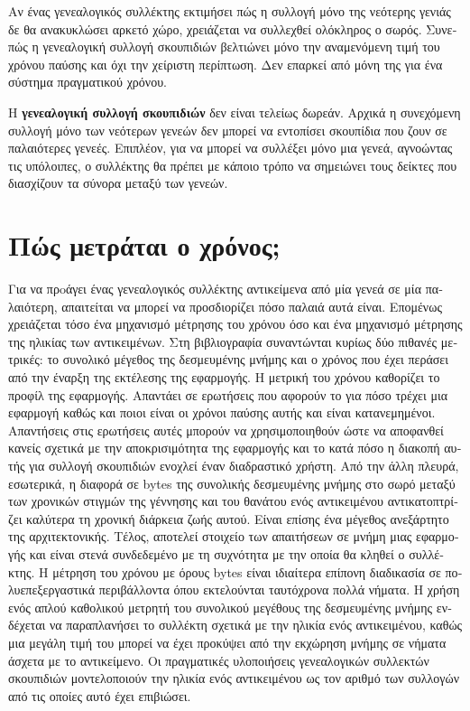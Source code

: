 \begin{greek}
Αν ένας γενεαλογικός συλλέκτης εκτιμήσει πώς η συλλογή μόνο
της νεότερης γενιάς δε θα ανακυκλώσει αρκετό χώρο, χρειάζεται
να συλλεχθεί ολόκληρος ο σωρός. Συνεπώς η γενεαλογική συλλογή
σκουπιδιών βελτιώνει μόνο την αναμενόμενη τιμή του χρόνου παύσης
και όχι την χείριστη περίπτωση. Δεν επαρκεί από μόνη της για ένα
σύστημα πραγματικού χρόνου.

Η \textbf{γενεαλογική συλλογή σκουπιδιών} δεν είναι τελείως
δωρεάν. Αρχικά η συνεχόμενη συλλογή μόνο των νεότερων γενεών
δεν μπορεί να εντοπίσει σκουπίδια που ζουν σε παλαιότερες γενεές.
Επιπλέον, για να μπορεί να συλλέξει μόνο μια γενεά, αγνοώντας
τις υπόλοιπες, ο συλλέκτης θα πρέπει με κάποιο τρόπο να σημειώνει
τους δείκτες που διασχίζουν τα σύνορα μεταξύ των γενεών.

\section{Πώς μετράται ο χρόνος;}
Για να πρoάγει ένας γενεαλογικός συλλέκτης αντικείμενα από μία γενεά σε μία 
παλαιότερη, απαιτείται να μπορεί να προσδιορίζει πόσο παλαιά αυτά είναι. 
Επομένως χρειάζεται τόσο ένα μηχανισμό μέτρησης του χρόνου όσο και ένα μηχανισμό 
μέτρησης της ηλικίας των αντικειμένων. Στη βιβλιογραφία συναντώνται κυρίως δύο 
πιθανές μετρικές: το συνολικό μέγεθος της δεσμευμένης μνήμης και ο χρόνος που 
έχει περάσει από την έναρξη της εκτέλεσης της εφαρμογής. Η μετρική του χρόνου 
καθορίζει το προφίλ της εφαρμογής. Απαντάει σε ερωτήσεις που αφορούν το για πόσο 
τρέχει μια εφαρμογή καθώς και ποιοι είναι οι χρόνοι παύσης αυτής και είναι 
κατανεμημένοι. Απαντήσεις στις ερωτήσεις αυτές μπορούν να χρησιμοποιηθούν ώστε 
να αποφανθεί κανείς σχετικά με την αποκρισιμότητα της εφαρμογής και το κατά πόσο 
η διακοπή αυτής για συλλογή σκουπιδιών ενοχλεί έναν διαδραστικό χρήστη. Από την 
άλλη πλευρά, εσωτερικά, η διαφορά σε bytes της συνολικής δεσμευμένης μνήμης στο 
σωρό μεταξύ των χρονικών στιγμών της γέννησης και του θανάτου ενός αντικειμένου 
αντικατοπτρίζει καλύτερα τη χρονική διάρκεια ζωής αυτού. Είναι επίσης ένα μέγεθος 
ανεξάρτητο της αρχιτεκτονικής. Τέλος, αποτελεί στοιχείο των απαιτήσεων σε μνήμη 
μιας εφαρμογής και είναι στενά συνδεδεμένο με τη συχνότητα με την οποία θα κληθεί 
ο συλλέκτης. Η μέτρηση του χρόνου με όρους bytes είναι ιδιαίτερα επίπονη διαδικασία 
σε πολυεπεξεργαστικά περιβάλλοντα όπου εκτελούνται ταυτόχρονα πολλά νήματα. Η χρήση 
ενός απλού καθολικού μετρητή του συνολικού μεγέθους της δεσμευμένης μνήμης ενδέχεται 
να παραπλανήσει το συλλέκτη σχετικά με την ηλικία ενός αντικειμένου, καθώς μια 
μεγάλη τιμή του μπορεί να έχει προκύψει από την εκχώρηση μνήμης σε νήματα άσχετα 
με το αντικείμενο. Οι πραγματικές υλοποιήσεις γενεαλογικών συλλεκτών σκουπιδιών 
μοντελοποιούν την ηλικία ενός αντικειμένου ως τον αριθμό των συλλογών από τις 
οποίες αυτό έχει επιβιώσει.


\end{greek}
